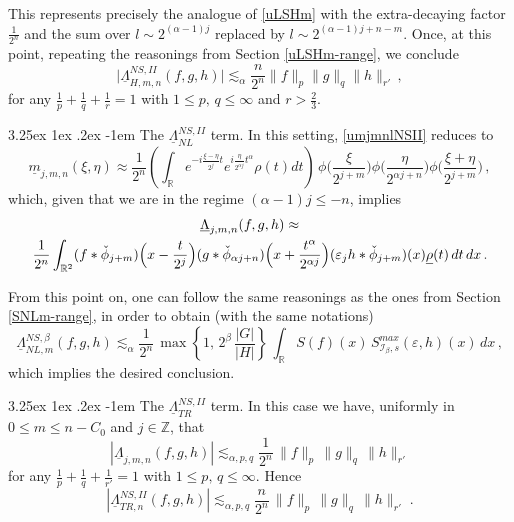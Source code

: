 \documentclass[a4paper,reqno]{amsart}
\makeatletter
\renewcommand\paragraph{\@startsection{paragraph}{4}{\z@}%
	{3.25ex \@plus1ex \@minus.2ex}%
	{-1em}%
	{\normalfont\normalsize\bfseries}}
\numberwithin{equation}{section}
\theoremstyle{definition}
\newcommand{\R}{\mathbb{R}}
\newcommand{\Z}{\mathbb{Z}}
\newcommand{\e}{\varepsilon}
\newcommand{\um}{\underline{m}}
\newcommand{\urho}{\underline{\rho}}
\newcommand{\uL}{\underline{\Lambda}}
\def\a{\alpha}
\def\b{\beta}
\def\I{\mathcal{I}}
\makeatother
\begin{document}
This represents precisely the analogue of \eqref{uLSHm} with the extra-decaying factor $\frac1{2^n}$ and the sum over $l\sim 2^{(\a-1)j}$ replaced by $l\sim 2^{(\a-1)j+n-m}$. Once, at this point, repeating the reasonings from Section \ref{uLSHm-range}, we conclude
\begin{equation}
	\big|\uL_{H,m,n}^{NS,II}(f,g,h)\big|\lesssim_{\a} \frac{n}{2^n}\|f\|_p\|g\|_q\|h\|_{r'}\,,
\end{equation}
for any $\frac1p+\frac1q+\frac1r=1$ with $1\le p,\, q\le \infty$ and $r>\frac23$.

\paragraph{The $\uL^{NS,II}_{NL}$ term.}
In this setting, \eqref{umjmnlNSII} reduces to
\begin{equation*}
	\um_{j,m,n}(\xi,\eta)\approx \frac{1}{2^n} \left(\int_\R e^{-i\frac{\xi-\eta}{2^j}  t}e^{i\frac{\eta}{2^{\a j}}t^\a}\rho(t)dt\right)\,\phi\Big(\frac{\xi}{2^{j+m}}\Big) \phi\Big(\frac{\eta}{2^{\a j+n}}\Big) \phi\Big(\frac{\xi+\eta}{2^{j+m}}\Big)\,,
\end{equation*}
which, given that we are in the regime $(\a-1)j\le -n$, implies
\begin{align}
	&\qquad\qquad\qquad\qquad\qquad\qquad\uL_{j,m,n}(f,g,h)\approx \\
	&\frac{1}{2^n}\int_{\R^2}
	(f*\check{\phi}_{j+m})\Big(x-\frac{t}{2^j}\Big)
	(g*\check{\phi}_{\a j+n})\Big(x+\frac{t^{\a}}{2^{\a j}}\Big)
	(\e_j h*\check{\phi}_{j+m})(x) \urho(t)\,dt\,dx\,.\nonumber \raisetag{.5\baselineskip}
\end{align}

From this point on, one can follow the same reasonings as the ones from Section \ref{SNLm-range}, in order to obtain (with the same notations)
\begin{equation}\label{maxshift2AB}
\uL^{NS,\b}_{NL,m}(f,g,h)\lesssim_{\a} \frac{1}{2^n}\,\max\left\{1,\,2^{\b}\,\frac{|G|}{|H|}\right\}\,\int_{\R} S(f)(x)\,S_{\I_{\b},s}^{max}(\e,h)(x)\,dx\,,
\end{equation}
which implies the desired conclusion.

\paragraph{The $\uL^{NS,II}_{TR}$ term.} In this case we have, uniformly in $0\leq m\leq n-C_0$ and $j\in \Z$, that
\begin{equation}
	|\uL_{j,m,n}(f,g,h)|\lesssim_{\a,p,q} \frac{1}{2^n}\,\|f\|_p\,\|g\|_q\,\|h\|_{r'}
\end{equation}
for any $\frac{1}{p}+\frac{1}{q}+\frac{1}{r'}=1$ with $1\leq p,\,q\leq \infty$. Hence
\begin{equation}
	|\uL^{NS,II}_{TR,n}(f,g,h)|\lesssim_{\a,p,q} \frac{n}{2^n}\,\|f\|_p\,\|g\|_q\,\|h\|_{r'}\;.
\end{equation}
\end{document}
